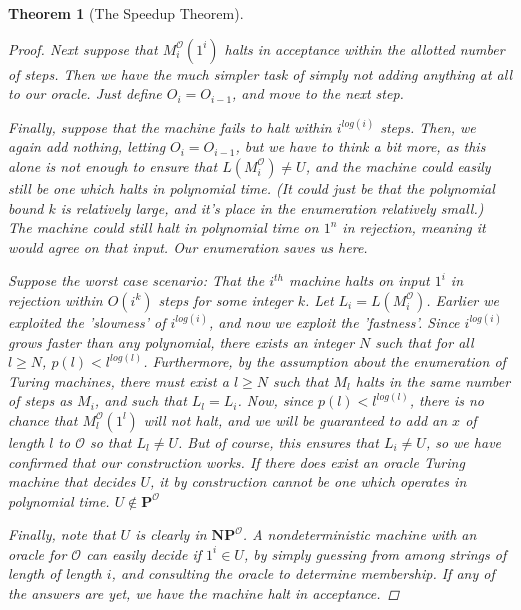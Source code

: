 \documentclass{article}
\theoremstyle{definition}
\theoremstyle{plain}
\theoremstyle{theorem}
\newtheorem{theorem}{Theorem}[section]
\begin{document}
\begin{theorem}[The Speedup Theorem]
\begin{proof}
    \par Next suppose that $M_i^{\mathcal{O}}(1^i)$ halts in acceptance within the allotted number of steps. Then we have the much simpler task of simply not adding anything at all to our oracle. Just define $O_i = O_{i-1}$, and move to the next step.
    \par Finally, suppose that the machine fails to halt within $i^{log(i)}$ steps. Then, we again add nothing, letting $O_i = O_{i-1}$, but we have to think a bit more, as this alone is not enough to ensure that $L(M_i^{\mathcal{O}}) \neq U$, and the machine could easily still be one which halts in polynomial time. (It could just be that the polynomial bound $k$ is relatively large, and it's place in the enumeration relatively small.) The machine could still halt in polynomial time on $1^n$ in rejection, meaning it would agree on that input. Our enumeration saves us here. 
    \par Suppose the worst case scenario: That the $i^{th}$ machine halts on input $1^i$ in rejection within $O(i^k)$ steps for some integer $k$. Let $L_i = L(M_i^{\mathcal{O}})$. Earlier we exploited the 'slowness' of $i^{log(i)}$, and now we exploit the 'fastness'. Since $i^{log(i)}$ grows faster than any polynomial, there exists an integer $N$ such that for all $l \geq N$, $p(l)<l^{log(l)}$. Furthermore, by the assumption about the enumeration of Turing machines, there must exist a $l \geq N$ such that $M_l$ halts in the same number of steps as $M_i$, and such that $L_l = L_i$. Now, since $p(l) < l^{log(l)}$, there is no chance that $M_l^{\mathcal{O}}(1^l)$ will not halt, and we will be guaranteed to add an $x$ of length $l$ to $\mathcal{O}$ so that $L_l \neq U$. But of course, this ensures that $L_i \neq U$, so we have confirmed that our construction works. If there does exist an oracle Turing machine that decides $U$, it by construction cannot be one which operates in polynomial time. $U \notin \textbf{P}^{\mathcal{O}}$
    \par Finally, note that $U$ is clearly in $\textbf{NP}^{\mathcal{O}}$. A nondeterministic machine with an oracle for $\mathcal{O}$ can easily decide if $1^i \in U$, by simply guessing from among strings of length of length $i$, and consulting the oracle to determine membership. If any of the answers are yet, we have the machine halt in acceptance.
\end{proof}

\end{theorem}
\end{document}
